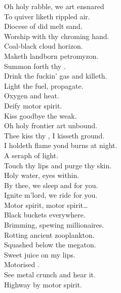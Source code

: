 
\label{album:petrodragonic-apocalypse}




Oh holy rabble, we art ensnared \\
To quiver liketh rippled air. \\
Diocese of did melt sand. \\
Worship with thy chroming hand. \\
Coal-black cloud horizon. \\
Maketh landborn petromyzon. \\
Summon forth thy . \\
Drink the fuckin' gas and killeth. \\

Light the fuel, propagate. \\
Oxygen and heat. \\
Deify motor spirit. \\
Kiss goodbye the weak. \\

Oh holy frontier art unbound. \\
Thee kiss thy , I kisseth ground. \\
I holdeth flame yond burns at night. \\
A seraph of  light. \\
Touch thy lips and purge thy skin. \\
Holy water, eyes within. \\
By thee, we sleep and  for you. \\
Ignite m'lord, we ride for you. \\

Motor spirit, motor spirit… \\

Black buckets everywhere. \\
Brimming, spewing millionaires. \\
Rotting ancient zooplankton. \\
Squashed below the megaton. \\
Sweet juice on my lips. \\
Motorised . \\
See metal crunch and hear it. \\
Highway  by motor spirit. \\

